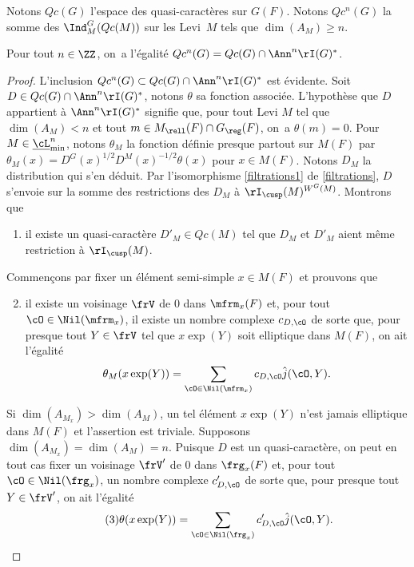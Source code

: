 Notons $Qc(G)$ l'espace des quasi-caractères sur $G(F)$. Notons $Qc^n(G)$ la somme des $\Ind_{M}^G(Qc(M))$ sur les Levi~$M$ tels que $\dim(A_{M})\geq n$.

\begin{prop*}
Pour tout $n\in \ZZ$, on~a l'égalité
$Qc^n(G)=Qc(G)\cap \Ann^n\rI(G)^*$.
\end{prop*}

\begin{proof}
L'inclusion $Qc^n(G)\subset Qc(G)\cap \Ann^n\rI(G)^*$ est évidente. Soit $D\in Qc(G)\cap \Ann^n\rI(G)^*$, notons $\theta$ sa fonction associée. L'hypothèse que $D$ appartient à $\Ann^n\rI(G)^*$ signifie que, pour tout Levi $M$ tel que $\dim(A_{M})<n$ et tout $m\in M_{\rell}(F)\cap G_{\reg}(F)$, on~a $\theta(m)=0$. Pour $M\in \underline{\cL}_{\min}^n$, notons $\theta_{M}$ la fonction définie presque partout sur $M(F)$ par $\theta_{M}(x)=D^G(x)^{1/2}D^M(x)^{-1/2}\theta(x)$ pour $x\in M(F)$. Notons $D_{M}$ la distribution qui s'en déduit.
Par l'isomorphisme \eqref{filtrations1} de \ref{filtrations}, $D$ s'envoie sur la somme des restrictions des $D_{M}$ à $\rI_{\cusp}(M)^{W^G(M)}$. Montrons que
\begin{enumerate}
\item\label{filtrationsurlegroupe1}
il existe un quasi-caractère $D'_{M}\in Qc(M)$ tel que $D_{M}$ et $D'_{M}$ aient même restriction à $\rI_{\cusp}(M)$.
\end{enumerate}

Commençons par fixer un élément semi-simple $x\in M(F)$ et prouvons que
\begin{enumerate}\setcounter{enumi}{1}
\item\label{filtrationsurlegroupe2}
il existe un voisinage $\frV$ de $0$ dans $\mfrm_{x}(F)$ et, pour tout $\cO\in \Nil(\mfrm_{x})$, il existe un nombre complexe $c_{D,\cO}$ de sorte que, pour presque tout $Y\in \frV$ tel que $x \exp(Y)$ soit elliptique dans $M(F)$, on ait l'égalité
\[
\theta_{M}(x \exp(Y))=\sum_{\cO\in \Nil(\mfrm_{x})}c_{D,\cO}\hat{j}(\cO,Y).
\]
\end{enumerate}

Si $\dim(A_{M_{x}})> \dim(A_{M})$, un tel élément $x \exp(Y)$ n'est jamais elliptique dans $M(F)$ et l'assertion est triviale. Supposons $\dim(A_{M_{x}})=\dim(A_{M})=n$. Puisque $D$ est un quasi-caractère, on peut en tout cas fixer un voisinage $\frV'$ de $0$ dans $\frg_{x}(F)$ et, pour tout $\cO\in \Nil(\frg_{x})$, un nombre complexe $c'_{D,\cO}$ de sorte que, pour presque tout $Y\in \frV'$, on ait l'égalité
\begin{equation}\tag{3}\label{filtrationsurlegroupe3}
\theta(x \exp(Y))=\sum_{\cO\in \Nil(\frg_{x})}c'_{D,\cO}\hat{j}(\cO,Y).
\end{equation}


\end{proof}
